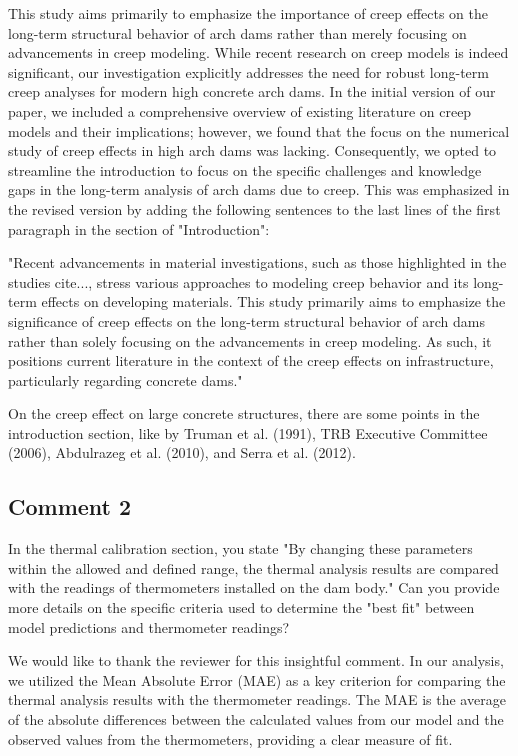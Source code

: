 \documentclass{ar2rc}
\begin{document}
	\AR This study aims primarily to emphasize the importance of creep effects on the long-term structural behavior of arch dams rather than merely focusing on advancements in creep modeling. While recent research on creep models is indeed significant, our investigation explicitly addresses the need for robust long-term creep analyses for modern high concrete arch dams. In the initial version of our paper, we included a comprehensive overview of existing literature on creep models and their implications; however, we found that the focus on the numerical study of creep effects in high arch dams was lacking. Consequently, we opted to streamline the introduction to focus on the specific challenges and knowledge gaps in the long-term analysis of arch dams due to creep. This was emphasized in the revised version by adding the following sentences to the last lines of the first paragraph in the section of "Introduction":
	
	"Recent advancements in material investigations, such as those highlighted in the studies cite{...}, stress various approaches to modeling creep behavior and its long-term effects on developing materials. This study primarily aims to emphasize the significance of creep effects on the long-term structural behavior of arch dams rather than solely focusing on the advancements in creep modeling. As such, it positions current literature in the context of the creep effects on infrastructure, particularly regarding concrete dams."
	

	\AR On the creep effect on large concrete structures, there are some points in the introduction section, like by Truman et al. (1991), TRB Executive Committee (2006), Abdulrazeg et al. (2010), and Serra et al. (2012).  
	
	
	\subsection{Comment 2}
	
	\RC In the thermal calibration section, you state "By changing these parameters within the allowed and defined range, the thermal analysis results are compared with the readings of thermometers installed on the dam body." Can you provide	more details on the specific criteria used to determine the "best fit" between model predictions and thermometer readings?
	

	\AR We would like to thank the reviewer for this insightful comment. In our analysis, we utilized the Mean Absolute Error (MAE) as a key criterion for comparing the thermal analysis results with the thermometer readings. The MAE is the average of the absolute differences between the calculated values from our model and the observed values from the thermometers, providing a clear measure of fit.
	
\end{document}
